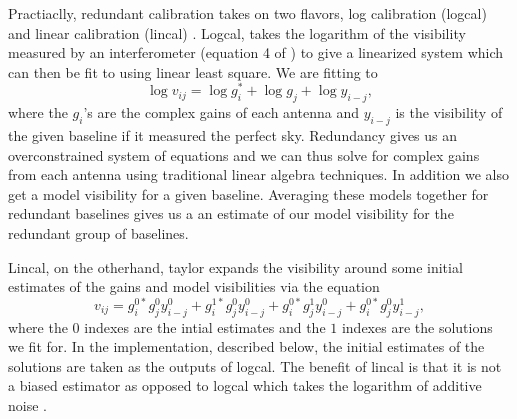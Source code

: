 \documentclass[twocolumn,numberedappendix]{emulateapj} \shorttitle{PSA64}
\begin{document}
Practiaclly, redundant calibration takes on two flavors, log calibration (logcal) and
linear calibration (lincal) \citep{liu_et_al2010,zheng_et_al2014}. Logcal, takes
the logarithm of the visibility measured by an interferometer (equation 4 of
\citet{zheng_et_al2014}) to give a linearized system which can then be fit to
using linear least square. We are fitting to
\begin{equation}\label{eqn:logcal}
    \log{v_{ij}} = \log{g_{i}^{*}} + \log{g_{j}} + \log{y_{i-j}},
\end{equation}
where the $g_{i}$'s are the
complex gains of each antenna and $y_{i-j}$ is the visibility of the given
baseline if it measured the perfect sky. Redundancy gives us an overconstrained
system of equations and we can thus solve for complex gains from each antenna
using traditional linear algebra techniques.  In addition we also get a model
visibility for a given baseline.  Averaging these models together for
redundant baselines gives us a an estimate of our model visibility for the
redundant group of baselines.

Lincal, on the otherhand, taylor expands the visibility around some initial
estimates of the gains and model visibilities via the equation 
\begin{equation}\label{eqn:lincal}
v_{ij} = g_{i}^{0*}g_{j}^{0}y_{i-j}^{0} + g_{i}^{1*}g_{j}^{0}y_{i-j}^{0} +
         g_{i}^{0*}g_{j}^{1}y_{i-j}^{0}+g_{i}^{0*}g_{j}^{0}y_{i-j}^{1},
\end{equation}
where the $0$ indexes are the intial estimates and the $1$ indexes are the
solutions we fit for. In the implementation, described below, the initial
estimates of the solutions are taken as the outputs of logcal. The benefit of
lincal is that it is not a biased estimator as opposed to logcal which takes the
logarithm of additive noise \citep{liu_et_al2010}.
\end{document}
